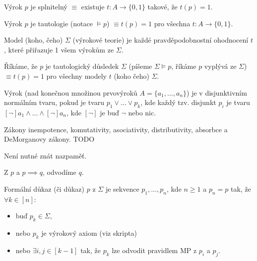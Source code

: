 \documentclass[12pt]{article}                   %
\begin{document}
        \begin{definice}
            Výrok $p$ je splnitelný $≡$ existuje $t: A \rightarrow \{0, 1\}$ takové, že $t(p) = 1$.
        \end{definice}

        \begin{definice}
            Výrok $p$ je tautologie (notace $\models p$) $≡ t(p) = 1$ pro všechna $t: A \rightarrow \{0, 1\}$.
        \end{definice}

        \begin{definice}[Model]
            Model (koho, čeho) $\Sigma$ (výrokové teorie) je každé pravděpodobnostní ohodnocení $t$, které přiřazuje 1 všem výrokům ze $\Sigma$.
        \end{definice}

        \begin{definice}[Vyplývání]
            Říkáme, že $p$ je tautologický důsledek $\Sigma$ (píšeme $\Sigma \models p$, říkáme $p$ vyplývá ze $\Sigma$) $≡ t(p) = 1$ pro všechny modely $t$ (koho čeho) $\Sigma$.
        \end{definice}

        \begin{definice}
            Výrok (nad konečnou množinou prvovýroků $A = \{a_1, …, a_n\}$) je v disjunktivním normálním tvaru, pokud je tvaru $p_1 \lor … \lor p_k$, kde každý tzv. disjunkt $p_i$ je tvaru $[\neg]a_1 \land … \land [\neg]a_n$, kde $[\neg]$ je buď $\neg$ nebo nic.
        \end{definice}

        \begin{definice}
            Zákony inempotence, komutativity, asociativity, distributivity, absorbce a DeMorganovy zákony. TODO

            Není nutné znát nazpaměť.
        \end{definice}

        \begin{definice}
           Z $p$ a $p \implies q$, odvodíme $q$.
        \end{definice}

        \begin{definice}
            Formální důkaz (či důkaz) $p$ z $\Sigma$ je sekvence $p_1, …, p_n$, kde $n≥1$ a $p_n = p$ tak, že $\forall k \in [n]$:

            \begin{itemize}
                \item buď $p_k \in \Sigma$,
                \item nebo $p_k$ je výrokový axiom (viz skripta)
                \item nebo $\exists i, j \in [k-1]$ tak, že $p_k$ lze odvodit pravidlem MP z $p_i$ a $p_j$.
            \end{itemize}
        \end{definice}
\end{document}
